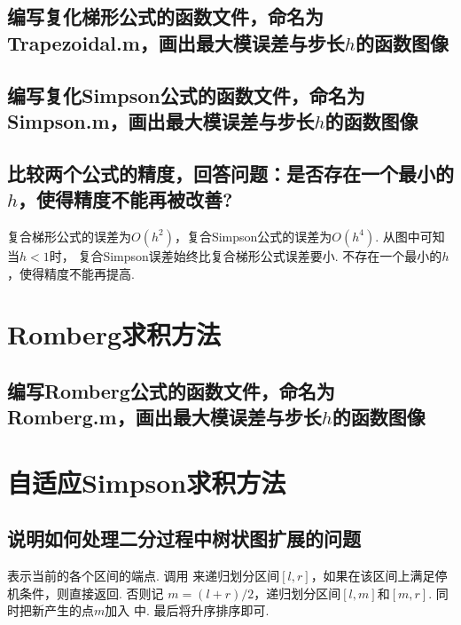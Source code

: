 \subsection{编写复化梯形公式的函数文件，命名为Trapezoidal.m，画出最大模误差与步长$h$的函数图像}
  

\subsection{编写复化Simpson公式的函数文件，命名为Simpson.m，画出最大模误差与步长$h$的函数图像}
  

\subsection{比较两个公式的精度，回答问题：是否存在一个最小的$h$，使得精度不能再被改善?}
  复合梯形公式的误差为$O(h^2)$，复合Simpson公式的误差为$O(h^4)$. 从图中可知当$h<1$时，
  复合Simpson误差始终比复合梯形公式误差要小. 不存在一个最小的$h$，使得精度不能再提高.

\section{Romberg求积方法}
\subsection{编写Romberg公式的函数文件，命名为Romberg.m，画出最大模误差与步长$h$的函数图像}
  

\newpage
\section{自适应Simpson求积方法}

\subsection{说明如何处理二分过程中树状图扩展的问题}
  表示当前的各个区间的端点. 调用
  来递归划分区间$[l, r]$，如果在该区间上满足停机条件，则直接返回. 否则记
  $m = (l+r)/2$，递归划分区间$[l, m]$和$[m, r]$. 同时把新产生的点$m$加入
  中. 最后将升序排序即可. 

